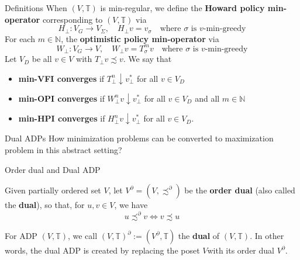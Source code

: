 \documentclass[aspectratio=169]{beamer} %
\begin{document}
\begin{frame}{Definitions}
When $(V,\mathbb{T})$ is min-regular, we define the \textbf{Howard policy min-operator} corresponding to $(V,\mathbb{T})$ via
$$
H_\perp: V_G\to V_\Sigma,\quad H_\perp v = v_\sigma \quad \text{where $\sigma$ is $v$-min-greedy}
$$
For each $m\in\mathbb{N}$, the \textbf{optimistic policy min-operator} via
$$
W_\perp: V_G\to V, \quad W_\perp v = T_\sigma^m v\quad \text{where $\sigma$ is $v$-min-greedy}
$$
Let $V_D$ be all $v\in V$ with $T_\perp v\precsim v$. We say that
\begin{itemize}
    \item \textbf{min-VFI converges} if $T_\perp^n \downarrow v_\perp^*$ for all $v\in V_D$
    \item \textbf{min-OPI converges} if $W_\perp^n v\downarrow v_\perp^*$ for all $v\in V_D$ and all $m\in\mathbb{N}$
    \item \textbf{min-HPI converges} if $H_\perp^n v\downarrow v_\perp^*$ for all $v\in V_D$.
\end{itemize}
\end{frame}
\begin{frame}{Dual ADPs}
How minimization problems can be converted to maximization problem in this abstract setting?
    
\end{frame}
\begin{frame}{Order dual and Dual ADP}
\begin{definition}
    Given partially ordered set $V$, let $V^\partial = (V,\precsim^\partial)$ be the \textbf{order dual} (also called the \textbf{dual}), so that, for $u,v\in V$, we have 
    $$
    u\precsim^\partial v\iff v\precsim u
    $$
\end{definition}
\begin{definition}
    For ADP $(V,\mathbb{T})$, we call $(V,\mathbb{T})^\partial:=(V^\partial, \mathbb{T})$ the \textbf{dual} of $(V,\mathbb{T})$. In other words, the dual ADP is created by replacing the poset $V$with its order dual $V^\partial$.
\end{definition}
\end{frame}
\end{document}
